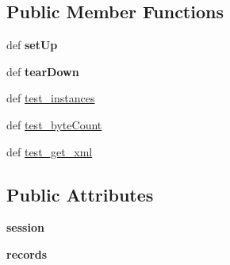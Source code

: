 \subsection*{Public Member Functions}
\begin{DoxyCompactItemize}
\item 
\hypertarget{classcheshire3_1_1test_1_1test_record_1_1_record_test_case_a57cafa3a4eeb37454d87eeea8a68d95e}{def {\bfseries set\-Up}}\label{classcheshire3_1_1test_1_1test_record_1_1_record_test_case_a57cafa3a4eeb37454d87eeea8a68d95e}

\item 
\hypertarget{classcheshire3_1_1test_1_1test_record_1_1_record_test_case_a444c429c956bc78b6b79776ca1c4f17f}{def {\bfseries tear\-Down}}\label{classcheshire3_1_1test_1_1test_record_1_1_record_test_case_a444c429c956bc78b6b79776ca1c4f17f}

\item 
def \hyperlink{classcheshire3_1_1test_1_1test_record_1_1_record_test_case_a291d9d82b01e2f7b28fae6bf80a801ba}{test\-\_\-instances}
\item 
def \hyperlink{classcheshire3_1_1test_1_1test_record_1_1_record_test_case_a94e0781fb013400dcae1bedacc20f980}{test\-\_\-byte\-Count}
\item 
def \hyperlink{classcheshire3_1_1test_1_1test_record_1_1_record_test_case_add27b55807020e32bbd720048aa328e2}{test\-\_\-get\-\_\-xml}
\end{DoxyCompactItemize}
\subsection*{Public Attributes}
\begin{DoxyCompactItemize}
\item 
\hypertarget{classcheshire3_1_1test_1_1test_record_1_1_record_test_case_abf98af5e1277e8de1d51adcef32a8f7b}{{\bfseries session}}\label{classcheshire3_1_1test_1_1test_record_1_1_record_test_case_abf98af5e1277e8de1d51adcef32a8f7b}

\item 
\hypertarget{classcheshire3_1_1test_1_1test_record_1_1_record_test_case_ad99450329b07d5b931224db04f1330e2}{{\bfseries records}}\label{classcheshire3_1_1test_1_1test_record_1_1_record_test_case_ad99450329b07d5b931224db04f1330e2}

\end{DoxyCompactItemize}


